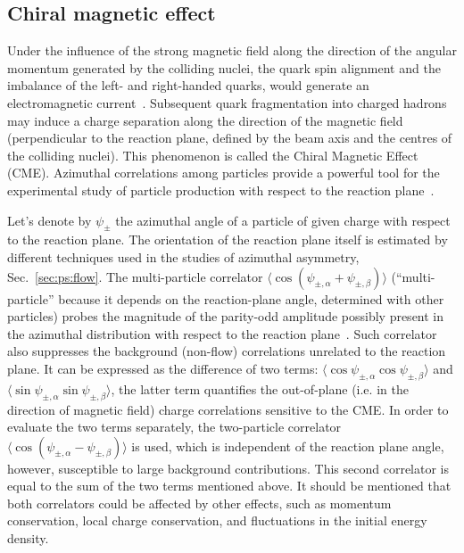 \subsection{Chiral magnetic effect}
\label{subsecks:chiral}
Under the influence of the strong magnetic field along the direction of the angular momentum generated by the colliding nuclei, the quark spin alignment and the imbalance of the left- and right-handed quarks, would generate an electromagnetic current~\cite{Kharzeev:2004ey,Fukushima:2008xe,Kharzeev:2007jp}. Subsequent quark fragmentation into charged hadrons may induce a charge separation along the direction of the magnetic field (perpendicular to the reaction plane, defined by the beam axis and the centres of the colliding nuclei). This phenomenon is called the Chiral Magnetic Effect (CME). Azimuthal correlations among particles provide a powerful tool for the experimental study of particle production with respect to the reaction plane~\cite{Abelev:2012pa}.

Let's denote by $\psi_\pm$ the azimuthal angle of a particle of given charge with respect to the reaction plane. The orientation of the reaction plane itself is estimated by different techniques used in the studies of azimuthal asymmetry, Sec.~\ref{sec:ps:flow}. The multi-particle correlator $\langle \cos{(\psi_{\pm,\alpha} + \psi_{\pm,\beta})} \rangle$ (``multi-particle'' because it depends on the reaction-plane angle, determined with other particles) probes the magnitude of the parity-odd amplitude possibly present in the azimuthal distribution with respect to the reaction plane~\cite{Voloshin:2004vk}. Such correlator also suppresses the background (non-flow) correlations unrelated to the reaction plane. It can be expressed as the difference of two terms: $\langle \cos{\psi_{\pm,\alpha}} \cos{\psi_{\pm,\beta}} \rangle$ and $\langle \sin{\psi_{\pm,\alpha}} \sin{\psi_{\pm,\beta}} \rangle$, the latter term quantifies the out-of-plane (i.e. in the direction of magnetic field) charge correlations sensitive to the CME. In order to evaluate the two terms separately, the two-particle correlator $\langle \cos{(\psi_{\pm,\alpha} - \psi_{\pm,\beta})} \rangle$ is used, which is independent of the reaction plane angle, however, susceptible to large background contributions. This second correlator is equal to the sum of the two terms mentioned above. It should be mentioned that both correlators could be affected by other effects, such as momentum conservation, local charge conservation, and fluctuations in the initial energy density.

